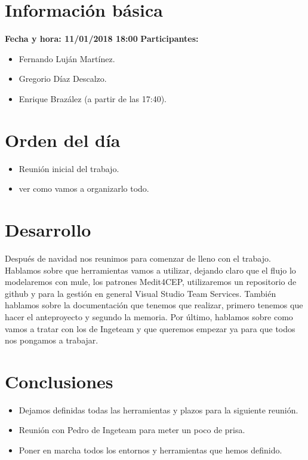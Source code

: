 \documentclass[a4paper]{article}
\begin{document}
\section{Información básica}
\textbf{Fecha y hora: 11/01/2018 18:00}
\newline
\textbf{Participantes:}
\begin{itemize}
	\item Fernando Luján Martínez.
    \item Gregorio Díaz Descalzo.
    \item Enrique Brazález (a partir de las 17:40).
\end{itemize}
\section{Orden del día}
\begin{itemize}
\item Reunión inicial del trabajo.
\item ver como vamos a organizarlo todo.
\end{itemize}
\section{Desarrollo}
Después de navidad nos reunimos para comenzar de lleno con el trabajo. Hablamos sobre que herramientas vamos a utilizar, dejando claro que el flujo lo modelaremos con mule, los patrones Medit4CEP, utilizaremos un repositorio de github y para la gestión en general Visual Studio Team Services. También hablamos sobre la documentación que tenemos que realizar, primero tenemos que hacer el anteproyecto y segundo la memoria. Por último, hablamos sobre como vamos a tratar con los de Ingeteam y que queremos empezar ya para que todos nos pongamos a trabajar.
\section{Conclusiones}
\begin{itemize}
\item Dejamos definidas todas las herramientas y plazos para la siguiente reunión.
\item Reunión con Pedro de Ingeteam para meter un poco de prisa.
\item Poner en marcha todos los entornos y herramientas que hemos definido.
\end{itemize}
\end{document}
